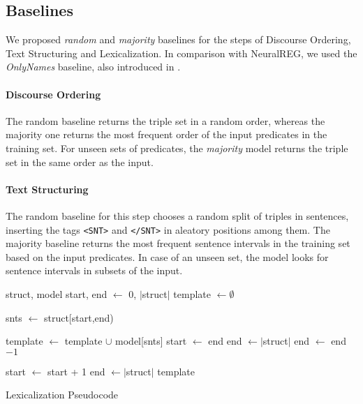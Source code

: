 \documentclass[11pt,a4paper]{article}
\begin{document}
\subsection{Baselines}

We proposed \textit{random} and \textit{majority} baselines for the steps of Discourse Ordering, Text Structuring and Lexicalization. In comparison with NeuralREG, we used the \textit{OnlyNames} baseline, also introduced in \citet{ferreira2018}. 

\paragraph{Discourse Ordering} The random baseline returns the triple set in a random order, whereas the majority one returns the most frequent order of the input predicates in the training set. For unseen sets of predicates, the \textit{majority} model returns the triple set in the same order as the input.







\paragraph{Text Structuring} The random baseline for this step chooses a random split of triples in sentences, inserting the tags \texttt{<SNT>} and \texttt{</SNT>} in aleatory positions among them. The majority baseline returns the most frequent sentence intervals in the training set based on the input predicates. In case of an unseen set, the model looks for sentence intervals in subsets of the input.

\begin{algorithm}
\footnotesize{
\begin{algorithmic}[1]
\Require struct, model 
    \State start, end $\gets$ 0, $|$struct$|$
    \State template $\gets \emptyset$
    
        \State snts $\gets$ struct[start,end)
        
            \State template $\gets$ template $\cup$ model[snts]
            \State start $\gets$ end
            \State end $\gets |$struct$|$
        \Else
            \State end $\gets$ end $- 1$
            
                \State start $\gets$ start + 1
                \State end $\gets |$struct$|$
            \EndIf
        \EndIf
    \EndWhile
    \State \Return template
\end{algorithmic}
}
\caption{Lexicalization Pseudocode}
\label{alg:lex}
\end{algorithm}
\end{document}

